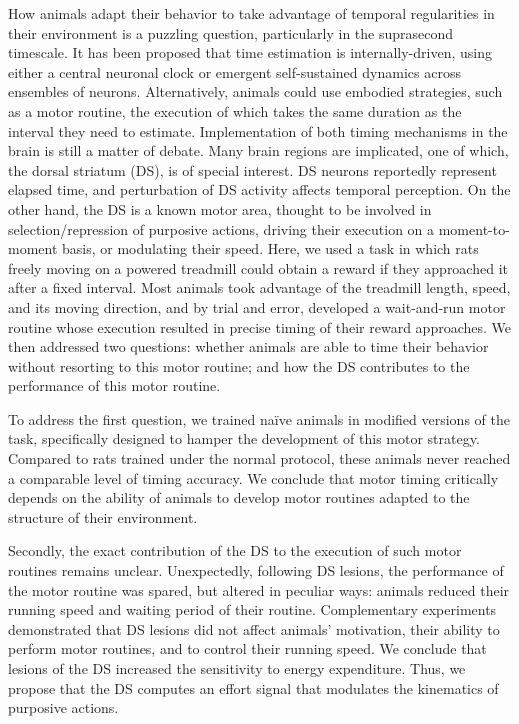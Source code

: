 How animals adapt their behavior to take advantage of temporal regularities in their environment is a puzzling question, particularly in the suprasecond timescale.
It has been proposed that time estimation is internally-driven, using either a central neuronal clock or emergent self-sustained dynamics across ensembles of neurons.
Alternatively, animals could use embodied strategies, such as a motor routine, the execution of which takes the same duration as the interval they need to estimate.
Implementation of both timing mechanisms in the brain is still a matter of debate.
Many brain regions are implicated, one of which, the dorsal striatum (DS), is of special interest.
DS neurons reportedly represent elapsed time, and perturbation of DS activity affects temporal perception.
On the other hand, the DS is a known motor area, thought to be involved in selection/repression of purposive actions, driving their execution on a moment-to-moment basis, or modulating their speed.
Here, we used a task in which rats freely moving on a powered treadmill could obtain a reward if they approached it after a fixed interval.
Most animals took advantage of the treadmill length, speed, and its moving direction, and by trial and error, developed a wait-and-run motor routine whose execution resulted in precise timing of their reward approaches.
We then addressed two questions:
    whether animals are able to time their behavior without resorting to this motor routine;
    and how the DS contributes to the performance of this motor routine.

\par

To address the first question, we trained na\"ive animals in modified versions of the task, specifically designed to hamper the development of this motor strategy.
Compared to rats trained under the normal protocol, these animals never reached a comparable level of timing accuracy.
We conclude that motor timing critically depends on the ability of animals to develop motor routines adapted to the structure of their environment.

\par

Secondly, the exact contribution of the DS to the execution of such motor routines remains unclear.
Unexpectedly, following DS lesions, the performance of the motor routine was spared, but altered in peculiar ways:
    animals reduced their running speed and waiting period of their routine.
Complementary experiments demonstrated that DS lesions did not affect animals' motivation, their ability to perform motor routines, and to control their running speed.
We conclude that lesions of the DS increased the sensitivity to energy expenditure.
Thus, we propose that the DS computes an effort signal that modulates the kinematics of purposive actions.